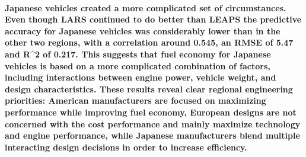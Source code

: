 \documentclass[
]{article}
\begin{document}
\paragraph{Japanese vehicles created a more complicated set of
circumstances. Even though LARS continued to do better than LEAPS the
predictive accuracy for Japanese vehicles was considerably lower than in
the other two regions, with a correlation around 0.545, an RMSE of 5.47
and R\^{}2 of 0.217. This suggests that fuel economy for Japanese
vehicles is based on a more complicated combination of factors,
including interactions between engine power, vehicle weight, and design
characteristics. These results reveal clear regional engineering
priorities: American manufacturers are focused on maximizing performance
while improving fuel economy, European designs are not concerned with
the cost performance and mainly maximize technology and engine
performance, while Japanese manufacturers blend multiple interacting
design decisions in order to increase
efficiency.}\label{japanese-vehicles-created-a-more-complicated-set-of-circumstances.-even-though-lars-continued-to-do-better-than-leaps-the-predictive-accuracy-for-japanese-vehicles-was-considerably-lower-than-in-the-other-two-regions-with-a-correlation-around-0.545-an-rmse-of-5.47-and-r2-of-0.217.-this-suggests-that-fuel-economy-for-japanese-vehicles-is-based-on-a-more-complicated-combination-of-factors-including-interactions-between-engine-power-vehicle-weight-and-design-characteristics.-these-results-reveal-clear-regional-engineering-priorities-american-manufacturers-are-focused-on-maximizing-performance-while-improving-fuel-economy-european-designs-are-not-concerned-with-the-cost-performance-and-mainly-maximize-technology-and-engine-performance-while-japanese-manufacturers-blend-multiple-interacting-design-decisions-in-order-to-increase-efficiency.}
\end{document}
